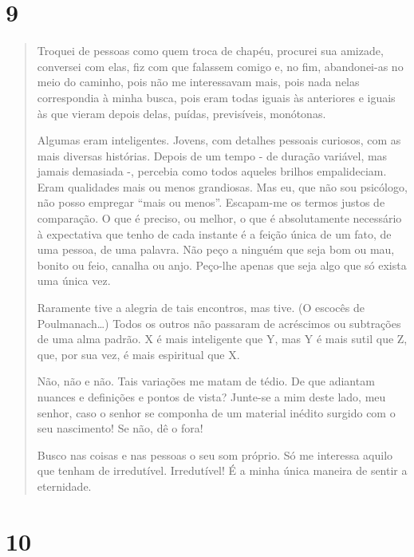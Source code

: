 \section{9}\label{section-8}

\begin{quote}
Troquei de pessoas como quem troca de chapéu, procurei sua amizade,
conversei com elas, fiz com que falassem comigo e, no fim, abandonei-as
no meio do caminho, pois não me interessavam mais, pois nada nelas
correspondia à minha busca, pois eram todas iguais às anteriores e
iguais às que vieram depois delas, puídas, previsíveis, monótonas.

Algumas eram inteligentes. Jovens, com detalhes pessoais curiosos, com
as mais diversas histórias. Depois de um tempo - de duração variável,
mas jamais demasiada -, percebia como todos aqueles brilhos
empalideciam. Eram qualidades mais ou menos grandiosas. Mas eu, que não
sou psicólogo, não posso empregar ``mais ou menos''. Escapam-me os
termos justos de comparação. O que é preciso, ou melhor, o que é
absolutamente necessário à expectativa que tenho de cada instante é a
feição única de um fato, de uma pessoa, de uma palavra. Não peço a
ninguém que seja bom ou mau, bonito ou feio, canalha ou anjo. Peço-lhe
apenas que seja algo que só exista uma única vez.

Raramente tive a alegria de tais encontros, mas tive. (O escocês de
Poulmanach\ldots{}) Todos os outros não passaram de acréscimos ou
subtrações de uma alma padrão. X é mais inteligente que Y, mas Y é mais
sutil que Z, que, por sua vez, é mais espiritual que X.

Não, não e não. Tais variações me matam de tédio. De que adiantam
nuances e definições e pontos de vista? Junte-se a mim deste lado, meu
senhor, caso o senhor se componha de um material inédito surgido com o
seu nascimento! Se não, dê o fora!

Busco nas coisas e nas pessoas o seu som próprio. Só me interessa aquilo
que tenham de irredutível. Irredutível! É a minha única maneira de
sentir a eternidade.
\end{quote}

\section{10}\label{section-9}

